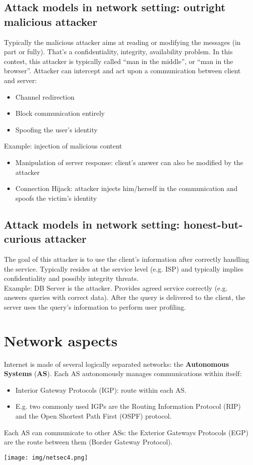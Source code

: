 \documentclass[a4paper, 10pt, titlepage]{article}
\begin{document}
\subsection{Attack models in network setting: outright malicious attacker}
Typically the malicious attacker aims at reading or modifying the messages (in part or fully). That’s a confidentiality, integrity, availability problem. In this contest, this attacker is typically called “man in the middle”, or “man in the browser”. Attacker can intercept and act upon a communication between client and server:
\begin{itemize}
\item Channel redirection
\item Block communication entirely
\item Spoofing the user’s identity
\end{itemize}
Example: injection of malicious content
\begin{itemize}
\item Manipulation of server response: client’s answer can also be modified by the attacker
\item Connection Hijack: attacker injects him/herself in the communication and spoofs the victim’s identity
\end{itemize}

\subsection{Attack models in network setting: honest-but-curious attacker}
The goal of this attacker is to use the client’s information after correctly handling the service. Typically resides at the service level (e.g. ISP) and typically implies confidentiality and possibly integrity threats.\\
Example: DB Server is the attacker. Provides agreed service correctly (e.g. answers queries with correct data). After the query is delivered to the client, the server uses the query’s information to perform user profiling.

\newpage
\section{Network aspects}
Internet is made of several logically separated networks: the \textbf{Autonomous Systems} (\textbf{AS}). Each AS autonomously manages communications within itself:
\begin{itemize}
\item Interior Gateway Protocols (IGP): route within each AS. 
\item E.g. two commonly used IGPs are the Routing Information Protocol (RIP) and the Open Shortest Path First (OSPF) protocol.
\end{itemize}
Each AS can communicate to other ASs: the Exterior Gateways Protocols (EGP) are the route between them (Border Gateway Protocol).
\begin{center}
	\texttt{[image: img/netsec4.png]}
\end{center}
\end{document}
